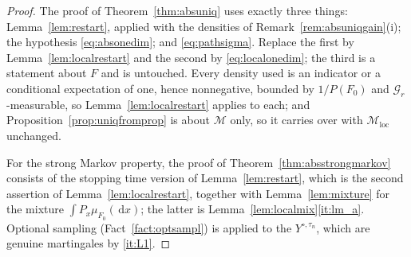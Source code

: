 \documentclass[11pt,a4paper]{article}
\theoremstyle{plain}
\theoremstyle{definition}
\theoremstyle{remark}
\newcommand{\Gilt}{\mathcal{G}}
\newcommand{\Msol}{\mathcal{M}}
\newcommand{\dif}{\,\mathrm{d}}
\begin{document}
\begin{proof}
  The proof of Theorem~\ref{thm:absuniq} uses exactly three things:
  Lemma~\ref{lem:restart}, applied with the densities of
  Remark~\ref{rem:absuniqgain}(i); the hypothesis \eqref{eq:absonedim}; and
  \eqref{eq:pathsigma}.  Replace the first by Lemma~\ref{lem:localrestart} and the
  second by \eqref{eq:localonedim}; the third is a statement about $F$ and is
  untouched.  Every density used is an indicator or a conditional expectation of
  one, hence nonnegative, bounded by $1/P(F_0)$ and $\Gilt_r$-measurable, so
  Lemma~\ref{lem:localrestart} applies to each; and
  Proposition~\ref{prop:uniqfromprop} is about $\Msol$ only, so it carries over
  with $\Msol_{\mathrm{loc}}$ unchanged.

  For the strong Markov property, the proof of
  Theorem~\ref{thm:absstrongmarkov} consists of the stopping time version of
  Lemma~\ref{lem:restart}, which is the second assertion of
  Lemma~\ref{lem:localrestart}, together with Lemma~\ref{lem:mixture} for the
  mixture $\int P_x \mu_{F_0}(\dif x)$; the latter is
  Lemma~\ref{lem:localmix}\ref{it:lm_a}.  Optional sampling
  (Fact~\ref{fact:optsampl}) is applied to the $Y^{\circ,\tau_n}$, which are
  genuine martingales by \ref{it:L1}.
\end{proof}
\end{document}
